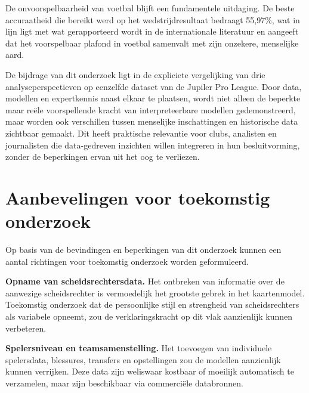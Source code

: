 \vspace{5pt}

De onvoorspelbaarheid van voetbal blijft een fundamentele uitdaging.
De beste accuraatheid die bereikt werd op het wedstrijdresultaat bedraagt 55,97\%, wat in lijn ligt
met wat gerapporteerd wordt in de internationale literatuur en aangeeft dat het voorspelbaar
plafond in voetbal samenvalt met zijn onzekere, menselijke aard.

\vspace{5pt}

De bijdrage van dit onderzoek ligt in de expliciete vergelijking van drie analyseperspectieven
op eenzelfde dataset van de Jupiler Pro League. Door data, modellen en expertkennis naast elkaar te plaatsen,
wordt niet alleen de beperkte maar reële voorspellende kracht van interpreteerbare modellen gedemonstreerd,
maar worden ook verschillen tussen menselijke inschattingen en historische data zichtbaar gemaakt.
Dit heeft praktische relevantie voor clubs, analisten en journalisten die data-gedreven inzichten willen integreren
in hun besluitvorming, zonder de beperkingen ervan uit het oog te verliezen.

\section{Aanbevelingen voor toekomstig onderzoek}

Op basis van de bevindingen en beperkingen van dit onderzoek kunnen een aantal richtingen voor toekomstig onderzoek worden geformuleerd.

\vspace{5pt}

\textbf{Opname van scheidsrechtersdata.} Het ontbreken van informatie over de aanwezige scheidsrechter
is vermoedelijk het grootste gebrek in het kaartenmodel. Toekomstig onderzoek dat de persoonlijke
stijl en strengheid van scheidsrechters als variabele opneemt, zou de verklaringskracht op dit vlak
aanzienlijk kunnen verbeteren.

\vspace{5pt}

\textbf{Spelersniveau en teamsamenstelling.} Het toevoegen van individuele spelersdata, blessures, transfers
en opstellingen zou de modellen aanzienlijk kunnen verrijken. Deze data zijn weliswaar kostbaar of moeilijk
automatisch te verzamelen, maar zijn beschikbaar via commerciële databronnen.

\vspace{5pt}

